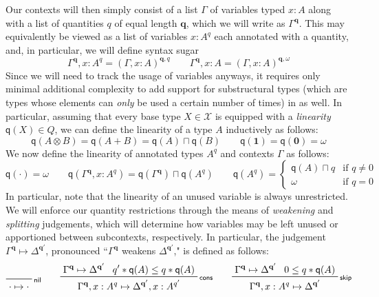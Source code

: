\documentclass[acmsmall,screen,review]{acmart}
\newcommand{\mc}[1]{\ensuremath{\mathcal{#1}}}
\newcommand{\mb}[1]{\ensuremath{\mathbf{#1}}}
\newcommand{\ms}[1]{\ensuremath{\mathsf{#1}}}
\newcommand{\cwk}[2]{#1 \mapsto #2}
\newcommand{\rle}[1]{{\scriptsize\textsf{#1}}}
\newcommand{\zeroq}{0}
\newcommand{\topq}{\omega}
\newcommand{\alquant}{\ms{q}}
\begin{document}
Our contexts will then simply
consist of a list $\Gamma$ of variables typed $x : A$ along with a list of quantities $q$ of equal
length $\mb{q}$, which we will write as $\Gamma^{\mb{q}}$. This may equivalently be viewed as a list
of variables $x : A^q$ each annotated with a quantity, and, in particular, we will define syntax
sugar
\begin{equation}
  \Gamma^{\mb{q}}, x : A^q = (\Gamma, x : A)^{\mb{q}, q} \qquad
  \Gamma^{\mb{q}}, x : A =  (\Gamma, x : A)^{\mb{q}, \topq}
\end{equation}
Since we will need to track the usage of variables anyways, it requires only minimal additional
complexity to add support for substructural types (which are types whose elements can \emph{only} be used a
certain number of times) in as well. In particular, assuming that every base type $X \in \mc{X}$ is
equipped with a \emph{linearity} $\alquant(X) \in Q$, we can define the linearity of a type $A$
inductively as follows:
\begin{equation}
  \alquant(A \otimes B) = \alquant(A + B) = \alquant(A) \sqcap \alquant(B) \qquad
  \alquant(\mb{1}) = \alquant(\mb{0}) = \topq
\end{equation}
We now define the linearity of annotated types $A^q$ and contexts $\Gamma$ as follows:
\begin{equation}
  \alquant(\cdot) = \topq \qquad
  \alquant(\Gamma^{\mb{q}}, x : A^q) 
    = \alquant(\Gamma^{\mb{q}}) \sqcap \alquant(A^q) \qquad 
  \alquant(A^q) = \begin{cases}
    \alquant(A) \sqcap q & \text{if } q \neq 0 \\
    \topq & \text{if } q = 0
  \end{cases}
\end{equation}
In particular, note that the linearity of an unused variable is always unrestricted.
%
We will enforce our quantity restrictions through the means of \emph{weakening} and \emph{splitting}
judgements, which will determine how variables may be left unused or apportioned between
subcontexts, respectively. In particular, the judgement $\cwk{\Gamma^{\mb{q}}}{\Delta^{\mb{q}'}}$,
pronounced ``$\Gamma^{\mb{q}}$ weakens $\Delta^{\mb{q'}}$," is defined as follows:
\begin{gather*}
  \prftree[r]{\rle{nil}}{\cwk{\cdot}{\cdot}} \qquad 
  \prftree[r]{\rle{cons}}
    {\cwk{\Gamma^{\mb{q}}}{\Delta^{\mb{q}'}}}
    {q' * \alquant(A) \leq q * \alquant(A)}
    {\cwk{\Gamma^{\mb{q}}, x : A^q}
         {\Delta^{\mb{q}'}, x : A^{q'}}} \qquad
  \prftree[r]{\rle{skip}}
    {\cwk{\Gamma^{\mb{q}}}{\Delta^{\mb{q}'}}}
    {\zeroq \leq q * \alquant(A)}
    {\cwk{\Gamma^{\mb{q}}, x : A^q}{\Delta}^{\mb{q}'}}
\end{gather*}
\end{document}
